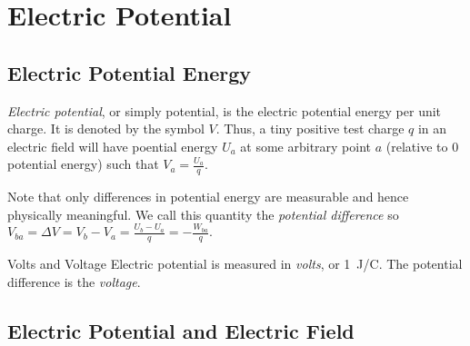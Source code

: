 \chapter{Electric Potential}

\section{Electric Potential Energy}

\begin{definition}
  \emph{Electric potential}, or simply potential, is the electric potential energy per unit charge. It is denoted by the symbol $V$. Thus, a tiny positive test charge $q$ in an electric field will have poential energy $U_a$ at some arbitrary point $a$ (relative to 0 potential energy) such that $V_a = \frac{U_a}{q}.$
\end{definition}
\begin{remark}
    Note that only differences in potential energy are measurable and hence physically meaningful. We call this quantity the \emph{potential difference} so $V_{ba} = \Delta V = V_b - V_a = \frac{U_b - U_a}{q} = -\frac{W_{ba}}{q}.$
\end{remark}
\begin{note}{Volts and Voltage}
    Electric potential is measured in \emph{volts}, or \qty{1}{J/C}. The potential difference is the \emph{voltage}.
\end{note}

\section{Electric Potential and Electric Field}

